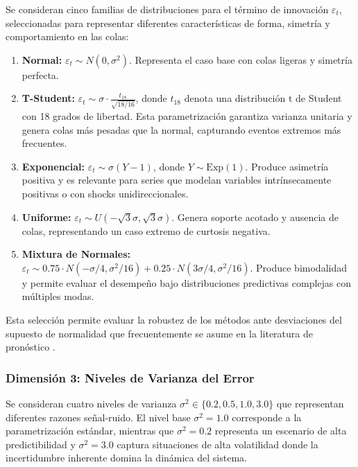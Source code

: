 Se consideran cinco familias de distribuciones para el término de innovación $\varepsilon_t$, seleccionadas para representar diferentes características de forma, simetría y comportamiento en las colas:

\begin{enumerate}
\item \textbf{Normal:} $\varepsilon_t \sim N(0, \sigma^2)$. Representa el caso base con colas ligeras y simetría perfecta.

\item \textbf{T-Student:} $\varepsilon_t \sim \sigma \cdot \frac{t_{18}}{\sqrt{18/16}}$, donde $t_{18}$ denota una distribución t de Student con 18 grados de libertad. Esta parametrización garantiza varianza unitaria y genera colas más pesadas que la normal, capturando eventos extremos más frecuentes.

\item \textbf{Exponencial:} $\varepsilon_t \sim \sigma(Y - 1)$, donde $Y \sim \text{Exp}(1)$. Produce asimetría positiva y es relevante para series que modelan variables intrínsecamente positivas o con shocks unidireccionales.

\item \textbf{Uniforme:} $\varepsilon_t \sim U(-\sqrt{3}\sigma, \sqrt{3}\sigma)$. Genera soporte acotado y ausencia de colas, representando un caso extremo de curtosis negativa.

\item \textbf{Mixtura de Normales:} $\varepsilon_t \sim 0.75 \cdot N(-\sigma/4, \sigma^2/16) + 0.25 \cdot N(3\sigma/4, \sigma^2/16)$. Produce bimodalidad y permite evaluar el desempeño bajo distribuciones predictivas complejas con múltiples modas.
\end{enumerate}

Esta selección permite evaluar la robustez de los métodos ante desviaciones del supuesto de normalidad que frecuentemente se asume en la literatura de pronóstico \parencite{Arrieta2017}.

\subsubsection{Dimensión 3: Niveles de Varianza del Error}

Se consideran cuatro niveles de varianza $\sigma^2 \in \{0.2, 0.5, 1.0, 3.0\}$ que representan diferentes razones señal-ruido. El nivel base $\sigma^2 = 1.0$ corresponde a la parametrización estándar, mientras que $\sigma^2 = 0.2$ representa un escenario de alta predictibilidad y $\sigma^2 = 3.0$ captura situaciones de alta volatilidad donde la incertidumbre inherente domina la dinámica del sistema.


